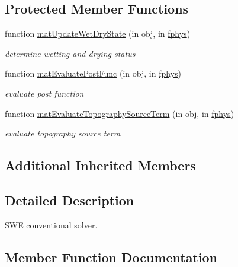 \subsection*{Protected Member Functions}
\begin{DoxyCompactItemize}
\item 
function \hyperlink{class_s_w_e_conventional2d_af4391251efde6dd1a4304681916f1a85}{mat\+Update\+Wet\+Dry\+State} (in obj, in \hyperlink{class_ndg_phys_a6b25724fc9474d32018439009072f0a9}{fphys})
\begin{DoxyCompactList}\small\item\em determine wetting and drying status \end{DoxyCompactList}\item 
function \hyperlink{class_s_w_e_conventional2d_afb47a46de6ed3ef5d094750c0a1ea6ca}{mat\+Evaluate\+Post\+Func} (in obj, in \hyperlink{class_ndg_phys_a6b25724fc9474d32018439009072f0a9}{fphys})
\begin{DoxyCompactList}\small\item\em evaluate post function \end{DoxyCompactList}\item 
function \hyperlink{class_s_w_e_conventional2d_a4d47d0d516ce7dba71beff5016df9085}{mat\+Evaluate\+Topography\+Source\+Term} (in obj, in \hyperlink{class_ndg_phys_a6b25724fc9474d32018439009072f0a9}{fphys})
\begin{DoxyCompactList}\small\item\em evaluate topography source term \end{DoxyCompactList}\end{DoxyCompactItemize}
\subsection*{Additional Inherited Members}


\subsection{Detailed Description}
S\+WE conventional solver. 

\subsection{Member Function Documentation}
\mbox{\label{class_s_w_e_conventional2d_a45bdb5dd88ae1ea73f2d7a7dd40cdbb9}} 
